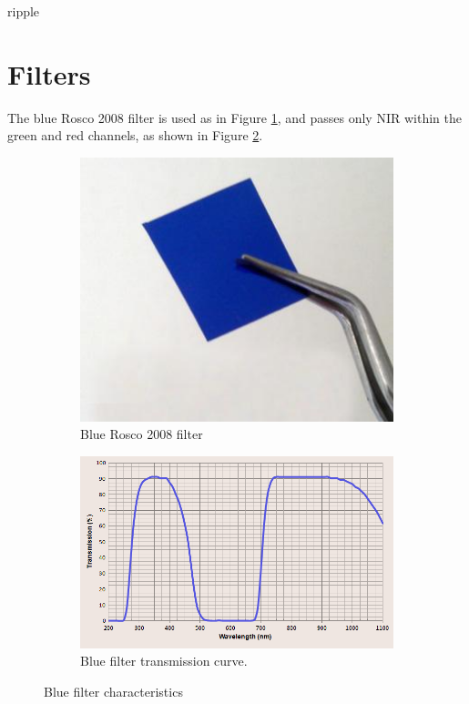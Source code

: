 ripple

\section{Filters}

The blue Rosco 2008 filter is used as in Figure \ref{fig:blue_filter}, and passes only NIR within the green and red channels, as shown in Figure \ref{fig:blue_curve}.

\begin{figure}[H]
\begin{subfigure}{0.5\textwidth}
\centering
\includegraphics[scale=0.45]{images/blue_filter.jpg}
\caption{Blue Rosco 2008 filter \cite{blue_filter}}
\label{fig:blue_filter}
\end{subfigure}
\begin{subfigure}{0.5\textwidth}
\centering
\includegraphics[scale=0.42]{images/superblueinfraredfiltercurve.png}
\caption{Blue filter transmission curve.}
\label{fig:blue_curve}
\end{subfigure}
\caption{Blue filter characteristics \cite{blue_curve}}
\label{fig:blue_character}
\end{figure}

